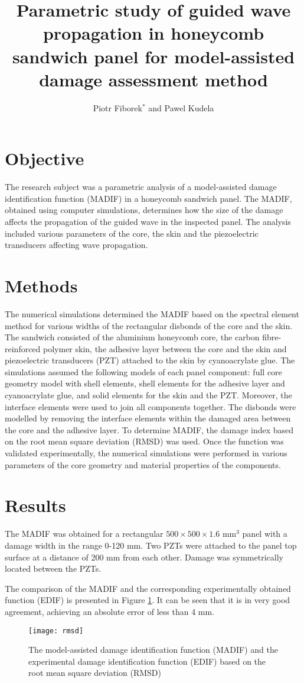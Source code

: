 \documentclass{article}
\title{Parametric study of guided wave propagation in honeycomb sandwich panel for model-assisted damage assessment method}
\author{Piotr Fiborek\(^*\) and Pawel Kudela\\
	\multicolumn{1}{p{.7\textwidth}}{\centering\emph{Institute
			of Fluid Flow Machinery,\\
			 Polish Academy of Sciences, Poland}\\
		\(^*\)pfiborek@imp.gda.pl}}
\date{}
\begin{document}
\maketitle
%
\section*{Objective}
The research subject was a parametric analysis of a model-assisted damage identification function (MADIF) in a honeycomb sandwich panel. The MADIF, obtained using computer simulations, determines how the size of the damage affects the propagation of the guided wave in the inspected panel. The analysis included various parameters of the core, the skin and the piezoelectric transducers affecting wave propagation.

\section*{Methods}
The numerical simulations determined the MADIF based on the spectral element method for various widths of the rectangular disbonds of the core and the skin. The sandwich consisted of the aluminium honeycomb core, the carbon fibre-reinforced polymer skin, the adhesive layer between the core and the skin and piezoelectric transducers (PZT) attached to the skin by cyanoacrylate glue. The simulations assumed the following models of each panel component: full core geometry model with shell elements, shell elements for the adhesive layer and cyanoacrylate glue, and solid elements for the skin and the PZT. Moreover, the interface elements were used to join all components together. The disbonds were modelled by removing the interface elements within the damaged area between the core and the adhesive layer. To determine MADIF, the damage index based on the root mean square deviation (RMSD) was used. Once the function was validated experimentally, the numerical simulations were performed in various parameters of the core geometry and material properties of the components.
\section*{Results}
The MADIF was obtained for a rectangular \(500\times500\times1.6\) mm\(^3\) panel with a damage width in the range 0-120 mm. Two PZTs were attached to the panel top surface at a distance of 200 mm from each other. Damage was symmetrically located between the PZTs.

The comparison of the MADIF and the corresponding experimentally obtained function (EDIF) is presented in Figure \ref{fig:comparison}.
It can be seen that it is in very good agreement, achieving an absolute error of less than 4 mm.
\begin{figure}[!tbh]
	\centering
	\texttt{[image: rmsd]}
	\caption{The model-assisted damage identification function (MADIF) and the experimental damage identification function (EDIF) based on the root mean square deviation (RMSD)}
	\label{fig:comparison}
\end{figure}
\end{document}
